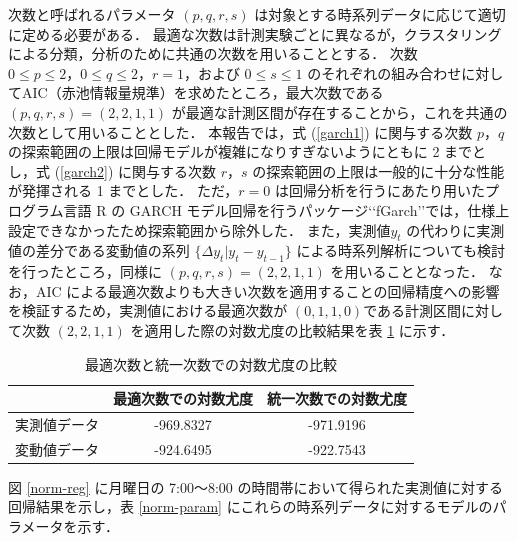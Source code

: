 \documentclass[technicalreport]{ieicej}
\begin{document}
次数と呼ばれるパラメータ $(p,q,r,s)$ は対象とする時系列データに応じて適切に定める必要がある．
最適な次数は計測実験ごとに異なるが，クラスタリングによる分類，分析のために共通の次数を用いることとする．
次数 $0\leq p\leq2，0\leq q\leq 2，r=1$，および $0\leq s\leq 1$ のそれぞれの組み合わせに対してAIC（赤池情報量規準）\cite{aic1}\cite{aic2}を求めたところ，最大次数である $(p,q,r,s)=(2,2,1,1)$ が最適な計測区間が存在することから，これを共通の次数として用いることとした．
本報告では，式 (\ref{garch1}) に関与する次数 $p，q$ の探索範囲の上限は回帰モデルが複雑になりすぎないようにともに 2 までとし，式 (\ref{garch2}) に関与する次数 $r，s$ の探索範囲の上限は一般的に十分な性能が発揮される 1 まで\cite{hansen2005forecast}とした．
ただ，$r = 0$ は回帰分析を行うにあたり用いたプログラム言語 R の GARCH モデル回帰を行うパッケージ\lq\lq{fGarch}\rq\rq{}では，仕様上設定できなかったため探索範囲から除外した．
また，実測値$ y_t$ の代わりに実測値の差分である変動値の系列 $\{\Delta y_t | y_t - y_{t-1} \}$ による時系列解析についても検討を行ったところ，同様に $(p,q,r,s)=(2,2,1,1)$ を用いることとなった．
なお，AIC による最適次数よりも大きい次数を適用することの回帰精度への影響を検証するため，実測値における最適次数が $(0,1,1,0) $である計測区間に対して次数 $(2,2,1,1)$ を適用した際の対数尤度の比較結果を表 \ref{more-param} に示す．

\begin{table}[tb]
\centering
\caption{最適次数と統一次数での対数尤度の比較}
\label{more-param}
\begin{tabular}{|l|c|c|}
\hline
&最適次数での対数尤度&統一次数での対数尤度\\
\hline
実測値データ&-969.8327&-971.9196\\
\hline
変動値データ&-924.6495&-922.7543\\
\hline
\end{tabular}
\end{table}

図 \ref{norm-reg} に月曜日の 7:00～8:00 の時間帯において得られた実測値に対する回帰結果を示し，表 \ref{norm-param} にこれらの時系列データに対するモデルのパラメータを示す．
\end{document}
